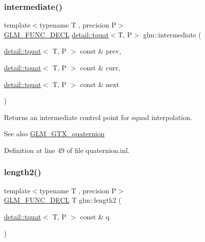 \subsubsection{\texorpdfstring{intermediate()}{intermediate()}}
{\footnotesize\ttfamily template$<$typename T , precision P$>$ \\
\hyperlink{setup_8hpp_ab2d052de21a70539923e9bcbf6e83a51}{G\+L\+M\+\_\+\+F\+U\+N\+C\+\_\+\+D\+E\+CL} \hyperlink{structglm_1_1detail_1_1tquat}{detail\+::tquat}$<$T, P$>$ glm\+::intermediate (\begin{DoxyParamCaption}\item[{\hyperlink{structglm_1_1detail_1_1tquat}{detail\+::tquat}$<$ T, P $>$ const \&}]{prev,  }\item[{\hyperlink{structglm_1_1detail_1_1tquat}{detail\+::tquat}$<$ T, P $>$ const \&}]{curr,  }\item[{\hyperlink{structglm_1_1detail_1_1tquat}{detail\+::tquat}$<$ T, P $>$ const \&}]{next }\end{DoxyParamCaption})}

Returns an intermediate control point for squad interpolation.

\begin{DoxySeeAlso}{See also}
\hyperlink{group__gtx__quaternion}{G\+L\+M\+\_\+\+G\+T\+X\+\_\+quaternion} 
\end{DoxySeeAlso}


Definition at line 49 of file quaternion.\+inl.

\mbox{\label{group__gtx__quaternion_gaac8d704c7dfac92835109953b88f1c92}} 
\subsubsection{\texorpdfstring{length2()}{length2()}}
{\footnotesize\ttfamily template$<$typename T , precision P$>$ \\
\hyperlink{setup_8hpp_ab2d052de21a70539923e9bcbf6e83a51}{G\+L\+M\+\_\+\+F\+U\+N\+C\+\_\+\+D\+E\+CL} T glm\+::length2 (\begin{DoxyParamCaption}\item[{\hyperlink{structglm_1_1detail_1_1tquat}{detail\+::tquat}$<$ T, P $>$ const \&}]{q }\end{DoxyParamCaption})}

